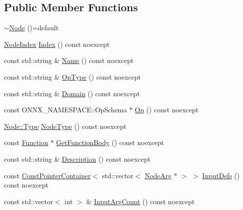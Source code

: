 \subsection*{Public Member Functions}
\begin{DoxyCompactItemize}
\item 
\mbox{\hyperlink{classonnxruntime_1_1Node_a7405651a8e96dce16cbe6ac0eabba429}{$\sim$\+Node}} ()=default
\item 
\mbox{\hyperlink{namespaceonnxruntime_af8773b5c12b5d8fd9292eb2e268df760}{Node\+Index}} \mbox{\hyperlink{classonnxruntime_1_1Node_afe7de845bf52c5fcad7f3eee224fa5b8}{Index}} () const noexcept
\item 
const std\+::string \& \mbox{\hyperlink{classonnxruntime_1_1Node_a430a9314c1b32353ab93044cf1a7f44e}{Name}} () const noexcept
\item 
const std\+::string \& \mbox{\hyperlink{classonnxruntime_1_1Node_adcc65a5e872db0609eaeafc89cc40437}{Op\+Type}} () const noexcept
\item 
const std\+::string \& \mbox{\hyperlink{classonnxruntime_1_1Node_a69a06f1a30552a32d6519f056ab02d71}{Domain}} () const noexcept
\item 
const O\+N\+N\+X\+\_\+\+N\+A\+M\+E\+S\+P\+A\+C\+E\+::\+Op\+Schema $\ast$ \mbox{\hyperlink{classonnxruntime_1_1Node_a77ae53ae1225db48b0144f854332acb5}{Op}} () const noexcept
\item 
\mbox{\hyperlink{classonnxruntime_1_1Node_a2d9625711aecc66f9b9373d61f794f6a}{Node\+::\+Type}} \mbox{\hyperlink{classonnxruntime_1_1Node_ac0a39d8bf044f8cfa0e5a50ad5c6e135}{Node\+Type}} () const noexcept
\item 
const \mbox{\hyperlink{classonnxruntime_1_1Function}{Function}} $\ast$ \mbox{\hyperlink{classonnxruntime_1_1Node_a1fde89964ac5029160b59aea532086a8}{Get\+Function\+Body}} () const noexcept
\item 
const std\+::string \& \mbox{\hyperlink{classonnxruntime_1_1Node_a9aebff1cb689800a30910cf2fe74df32}{Description}} () const noexcept
\item 
const \mbox{\hyperlink{classonnxruntime_1_1ConstPointerContainer}{Const\+Pointer\+Container}}$<$ std\+::vector$<$ \mbox{\hyperlink{classonnxruntime_1_1NodeArg}{Node\+Arg}} $\ast$ $>$ $>$ \mbox{\hyperlink{classonnxruntime_1_1Node_a8f6a801fc3cdc6efdb09f31a242e3f45}{Input\+Defs}} () const noexcept
\item 
const std\+::vector$<$ int $>$ \& \mbox{\hyperlink{classonnxruntime_1_1Node_a029f57f45c28c271b0a4f3edd6824f81}{Input\+Arg\+Count}} () const noexcept
\item 

\end{DoxyCompactItemize}
